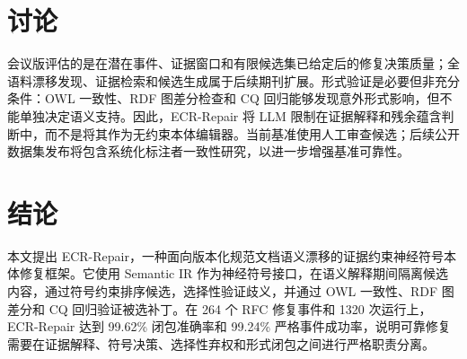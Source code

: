 \documentclass[conference]{IEEEtran}
\begin{document}
\section{讨论}

会议版评估的是在潜在事件、证据窗口和有限候选集已给定后的修复决策质量；全语料漂移发现、证据检索和候选生成属于后续期刊扩展。形式验证是必要但非充分条件：OWL 一致性、RDF 图差分检查和 CQ 回归能够发现意外形式影响，但不能单独决定语义支持。因此，ECR-Repair 将 LLM 限制在证据解释和残余蕴含判断中，而不是将其作为无约束本体编辑器。当前基准使用人工审查候选；后续公开数据集发布将包含系统化标注者一致性研究，以进一步增强基准可靠性。

\section{结论}

本文提出 ECR-Repair，一种面向版本化规范文档语义漂移的证据约束神经符号本体修复框架。它使用 Semantic IR 作为神经符号接口，在语义解释期间隔离候选内容，通过符号约束排序候选，选择性验证歧义，并通过 OWL 一致性、RDF 图差分和 CQ 回归验证被选补丁。在 264 个 RFC 修复事件和 1320 次运行上，ECR-Repair 达到 99.62\% 闭包准确率和 99.24\% 严格事件成功率，说明可靠修复需要在证据解释、符号决策、选择性弃权和形式闭包之间进行严格职责分离。



\end{document}
